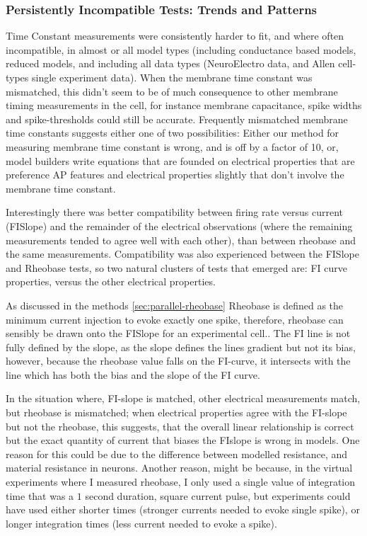 

\subsubsection{Persistently Incompatible Tests: Trends and Patterns}

Time Constant measurements were consistently harder to fit, and where often incompatible, in almost or all model types (including conductance based models, reduced models, and including all data types (NeuroElectro data, and Allen cell-types single experiment data). When the membrane time constant was mismatched, this didn't seem to be of much consequence to other membrane timing measurements in the cell, for instance membrane capacitance, spike widths and spike-thresholds could still be accurate. Frequently mismatched membrane time constants suggests either one of two possibilities: Either our method for measuring membrane time constant is wrong, and is off by a factor of 10, or, model builders write equations that are founded on electrical properties that are preference AP features and electrical properties slightly that don't involve the membrane time constant.

Interestingly there was better compatibility between firing rate versus current (FISlope) and the remainder of the electrical observations (where the remaining measurements tended to agree well with each other), than between rheobase and the same measurements. Compatibility was also experienced between the FISlope and Rheobase tests, so two natural clusters of tests that emerged are: FI curve properties, versus the other electrical properties.

As discussed in the methods \ref{sec:parallel-rheobase} Rheobase is defined as the minimum current injection to evoke exactly one spike, therefore, rheobase can sensibly be drawn onto the FISlope for an experimental cell.. The FI line is not fully defined by the slope, as the slope defines the lines gradient but not its bias, however, because the rheobase value falls on the FI-curve, it intersects with the line which has both the bias and the slope of the FI curve. 

In the situation where, FI-slope is matched, other electrical measurements match, but rheobase is mismatched; when electrical properties agree with the FI-slope but not the rheobase, this suggests, that the overall linear relationship is correct but the exact quantity of current that biases the FIslope is wrong in models. One reason for this could be due to the difference between modelled resistance, and material resistance in neurons. Another reason, might be because, in the virtual experiments where I measured rheobase, I only used a single value of integration time that was a $1$ second duration,  square current pulse, but experiments could have used either shorter times (stronger currents needed to evoke single spike), or longer integration times (less current needed to evoke a spike).


